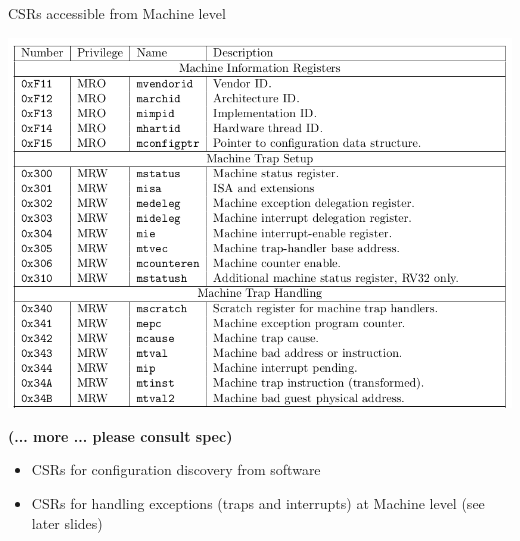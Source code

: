 \documentclass{article}
\begin{document}
\begin{center}
  {\Huge
    CSRs accessible from Machine level}

  \vspace*{0.2in}

  \begin{minipage}{9in}\LARGE
    \begin{center}
      \includegraphics[width=7in]{Figs/CSRs_Machine_Level.png}

      {\large\bf (... more ... please consult spec)}
    \end{center}

    \begin{itemize}
    \item CSRs for configuration discovery from software

    \item CSRs for handling exceptions (traps and interrupts) at Machine level (see later slides)
    \end{itemize}
  \end{minipage}

\end{center}

\clearpage

\end{document}
